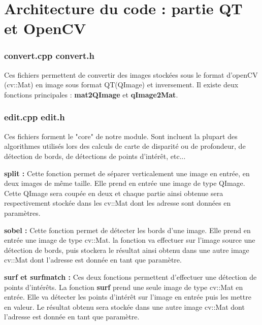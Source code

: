 \documentclass[a4paper]{article}
\begin{document}

\section{Architecture du code : partie QT et OpenCV}

\subsubsection*{convert.cpp convert.h}

Ces fichiers permettent de convertir des images stockées sous le format d'openCV
(cv::Mat) en image sous format QT(QImage) et inversement. Il existe deux fonctions
principales : \textbf{mat2QImage} et \textbf{qImage2Mat}.

\subsubsection*{edit.cpp edit.h}

Ces fichiers forment le "core" de notre module. Sont incluent la plupart des
algorithmes utilisés lors des calculs de carte de disparité ou de profondeur,
de détection de bords, de détections de points d'intérêt, etc...


\textbf{split :} Cette fonction permet de séparer verticalement une image en
entrée, en deux images de même taille. Elle prend en entrée une image de type
QImage. Cette QImage sera coupée en deux et chaque partie ainsi obtenue sera
respectivement stockée dans les cv::Mat dont les adresse sont données en paramètres.


\textbf{sobel :} Cette fonction permet de détecter les bords d'une image. Elle
prend en entrée une image de type cv::Mat. la fonction va effectuer sur l'image
source une détection de bords, puis stockera le résultat ainsi obtenu dans une
autre image cv::Mat dont l'adresse est donnée en tant que paramètre.


\textbf{surf et surfmatch :} Ces deux fonctions permettent d'effectuer une détection
de points d'intérêts. La fonction \textbf{surf} prend une seule image de type
cv::Mat en entrée. Elle va détecter les points d'intérêt sur l'image en entrée puis
les mettre en valeur. Le résultat obtenu sera stockée dans une autre image cv::Mat
dont l'adresse est donnée en tant que paramètre.
\end{document}
